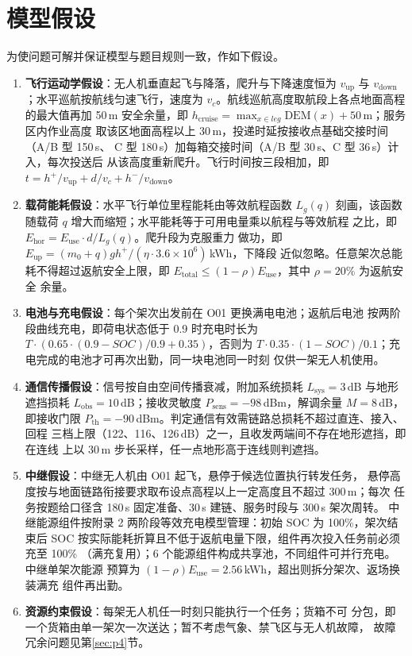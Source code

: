 \section{模型假设}
\label{sec:assume}

为使问题可解并保证模型与题目规则一致，作如下假设。

\begin{enumerate}
\item \textbf{飞行运动学假设}：无人机垂直起飞与降落，爬升与下降速度恒为
$v_{\mathrm{up}}$ 与 $v_{\mathrm{down}}$；水平巡航按航线匀速飞行，速度为
$v_c$。航线巡航高度取航段上各点地面高程的最大值再加 50\,m 安全余量，即
$h_{\mathrm{cruise}}=\max_{x\in leg}\mathrm{DEM}(x)+50$\,m；服务区内作业高度
取该区地面高程以上 30\,m，投递时延按接收点基础交接时间（A/B 型 150\,s、
C 型 180\,s）加每箱交接时间（A/B 型 30\,s、C 型 36\,s）计入，每次投送后
从该高度重新爬升。飞行时间按三段相加，即
$t=h^+/v_{\mathrm{up}}+d/v_c+h^-/v_{\mathrm{down}}$。

\item \textbf{载荷能耗假设}：水平飞行单位里程能耗由等效航程函数 $L_g(q)$
刻画，该函数随载荷 $q$ 增大而缩短；水平能耗等于可用电量乘以航程与等效航程
之比，即 $E_{\mathrm{hor}}=E_{\mathrm{use}}\cdot d/L_g(q)$。爬升段为克服重力
做功，即 $E_{\mathrm{up}}=(m_0+q)gh^+/(\eta\cdot3.6\times10^6)$\,kWh，下降段
近似忽略。任意架次总能耗不得超过返航安全上限，即
$E_{\mathrm{total}}\le(1-\rho)E_{\mathrm{use}}$，其中 $\rho=20\%$ 为返航安全
余量。

\item \textbf{电池与充电假设}：每个架次出发前在 O01 更换满电电池；返航后电池
按两阶段曲线充电，即荷电状态低于 0.9 时充电时长为
$T\cdot(0.65\cdot(0.9-SOC)/0.9+0.35)$，否则为
$T\cdot0.35\cdot(1-SOC)/0.1$；充电完成的电池才可再次出勤，同一块电池同一时刻
仅供一架无人机使用。

\item \textbf{通信传播假设}：信号按自由空间传播衰减，附加系统损耗
$L_{\mathrm{sys}}=3$\,dB 与地形遮挡损耗 $L_{\mathrm{obs}}=10$\,dB；接收灵敏度
$P_{\mathrm{sens}}=-98$\,dBm，解调余量 $M=8$\,dB，即接收门限
$P_{\mathrm{th}}=-90$\,dBm。判定通信有效需链路总损耗不超过直连、接入、回程
三档上限（122、116、126\,dB）之一，且收发两端间不存在地形遮挡，即在连线
上以 30\,m 步长采样，任一点地形高于连线则判遮挡。

\item \textbf{中继假设}：中继无人机由 O01 起飞，悬停于候选位置执行转发任务，
悬停高度按与地面链路衔接要求取布设点高程以上一定高度且不超过 300\,m；每次
任务按题给口径含 180\,s 固定准备、30\,s 建链、服务时段与 300\,s 架次周转。
中继能源组件按附录 2 两阶段等效充电模型管理：初始 SOC 为 100\%，架次结束后
SOC 按实际能耗折算且不低于返航电量下限，组件再次投入任务前必须充至 100\%
（满充复用）；6 个能源组件构成共享池，不同组件可并行充电。中继单架次能源
预算为 $(1-\rho)E_{\mathrm{use}}=2.56$\,kWh，超出则拆分架次、返场换装满充
组件再出勤。

\item \textbf{资源约束假设}：每架无人机任一时刻只能执行一个任务；货箱不可
分包，即一个货箱由单一架次一次送达；暂不考虑气象、禁飞区与无人机故障，
故障冗余问题见第\ref{sec:p4}节。
\end{enumerate}